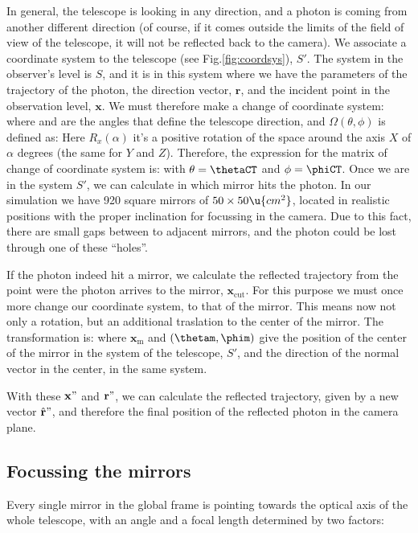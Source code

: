 In general, the telescope is looking in any direction, and a photon is
coming from another different direction (of course, if it comes
outside the limits of the field of view of the telescope, it will not
be reflected back to the camera). We associate a coordinate system to the
telescope (see Fig.\ref{fig:coordsys}), $S'$. The system in the
observer's level is $S$, and it is in this system where we have the
parameters of the trajectory of the photon, the direction vector,
$\mathbf{r}$, and the incident point in the observation level,
$\mathbf{x}$. We must therefore make a change of coordinate system:
%
\rotateAeq
%
where \thetaCT and \phiCT are the angles that define the telescope
direction, and $\Omega(\theta,\phi)$ is defined as:
%
\omegaAeq
%
Here $R_x(\alpha)$ it's a positive rotation of the space around the
axis $X$ of $\alpha$ degrees (the same for $Y$ and $Z$). Therefore,
the expression for the matrix of change of coordinate system is:
%
\transformAeq
%
with $\theta=\thetaCT$ and $\phi=\phiCT$. Once we are in the system
$S'$, we can calculate in which mirror hits the photon. In our
simulation we have 920 square mirrors of $50\times 50\u{cm^2}$,
located in realistic positions with the proper inclination for
focussing in the camera. Due to this fact, there are small gaps
between to adjacent mirrors, and the photon could be lost through one
of these ``holes''.

\collimationfig
%
If the photon indeed hit a mirror, we calculate the reflected
trajectory from the point were the photon arrives to the mirror,
$\mathbf{x}_{\mathrm{cut}}$. For this purpose we must once more change
our coordinate system, to that of the mirror. This means now not only
a rotation, but an additional traslation to the center of the mirror.
The transformation is:
%
\transformBeq
%
where $\mathbf{x}_{\mathrm{m}}$ and $(\thetam,\phim)$ give the
position of the center of the mirror in the system of the telescope,
$S'$, and the direction of the normal vector in the center, in the
same system.

With these $\mathbf{x}"$ and $\mathbf{r}"$, we can calculate the
reflected trajectory, given by a new vector $\hat{\mathbf{r}}"$, and
therefore the final position of the reflected photon in the camera
plane.

\subsection{Focussing the mirrors}

Every single mirror in the global frame is pointing towards the
optical axis of the whole telescope, with an angle and a focal length
determined by two factors:

